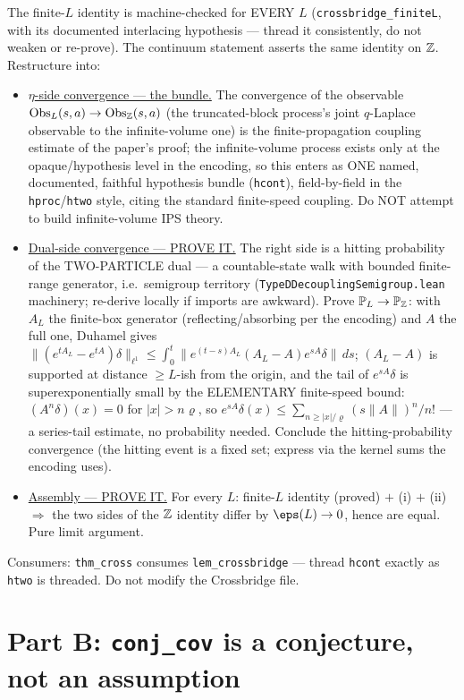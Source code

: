 \documentclass[11pt]{article}
\theoremstyle{plain}
\theoremstyle{remark}
\begin{document}
The finite-$L$ identity is machine-checked for EVERY $L$
(\texttt{crossbridge\_finiteL}, with its documented interlacing hypothesis ---
thread it consistently, do not weaken or re-prove). The continuum statement
asserts the same identity on $\mathbb{Z}$. Restructure into:
\begin{itemize}
\item[(i)] \underline{$\eta$-side convergence --- the bundle.} The convergence
of the observable
$\mathrm{Obs}_L(s,a)\to\mathrm{Obs}_{\mathbb{Z}}(s,a)$ (the truncated-block process's
joint $q$-Laplace observable to the infinite-volume one) is the
finite-propagation coupling estimate of the paper's proof; the infinite-volume
process exists only at the opaque/hypothesis level in the encoding, so this
enters as ONE named, documented, faithful hypothesis bundle (\texttt{hcont}),
field-by-field in the \texttt{hproc}/\texttt{htwo} style, citing the standard
finite-speed coupling. Do NOT attempt to build infinite-volume IPS theory.
\item[(ii)] \underline{Dual-side convergence --- PROVE IT.} The right side is a
hitting probability of the TWO-PARTICLE dual --- a countable-state walk with
bounded finite-range generator, i.e.\ semigroup territory
(\texttt{TypeDDecouplingSemigroup.lean} machinery; re-derive locally if
imports are awkward). Prove $\mathbb{P}_L\to\mathbb{P}_{\mathbb{Z}}$: with $A_L$ the finite-box
generator (reflecting/absorbing per the encoding) and $A$ the full one,
Duhamel gives
$\|(e^{tA_L}-e^{tA})\delta\|_{\ell^1}\le\int_0^t\|e^{(t-s)A_L}(A_L-A)
e^{sA}\delta\|\,ds$; $(A_L-A)$ is supported at distance $\ge L$-ish from the
origin, and the tail of $e^{sA}\delta$ is superexponentially small by the
ELEMENTARY finite-speed bound: $(A^n\delta)(x)=0$ for $|x|>n\varrho$, so
$e^{sA}\delta(x)\le\sum_{n\ge|x|/\varrho}(s\|A\|)^n/n!$ --- a series-tail
estimate, no probability needed. Conclude the hitting-probability convergence
(the hitting event is a fixed set; express via the kernel sums the encoding
uses).
\item[(iii)] \underline{Assembly --- PROVE IT.} For every $L$: finite-$L$
identity (proved) $+$ (i) $+$ (ii) $\Rightarrow$ the two sides of the $\mathbb{Z}$
identity differ by $\eps(L)\to0$, hence are equal. Pure limit argument.
\end{itemize}
Consumers: \texttt{thm\_cross} consumes \texttt{lem\_crossbridge} --- thread
\texttt{hcont} exactly as \texttt{htwo} is threaded. Do not modify the
Crossbridge file.

\section*{Part B: \texttt{conj\_cov} is a conjecture, not an assumption}
\end{document}
